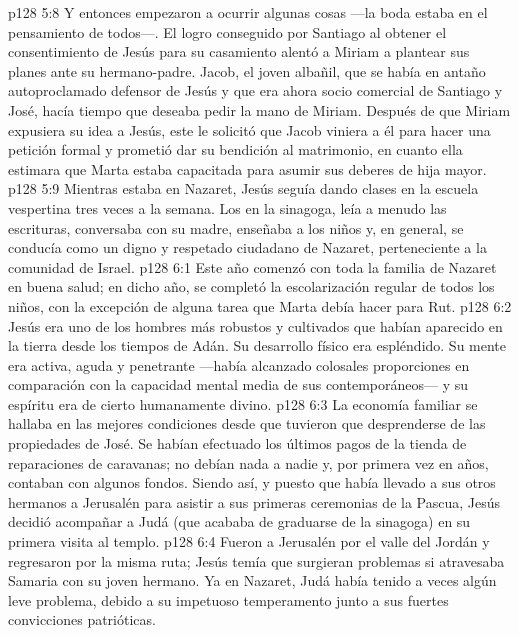 \vs p128 5:8 Y entonces empezaron a ocurrir algunas cosas ---la boda estaba en el pensamiento de todos---. El logro conseguido por Santiago al obtener el consentimiento de Jesús para su casamiento alentó a Miriam a plantear sus planes ante su hermano\hyp{}padre. Jacob, el joven albañil, que se había en antaño autoproclamado defensor de Jesús y que era ahora socio comercial de Santiago y José, hacía tiempo que deseaba pedir la mano de Miriam. Después de que Miriam expusiera su idea a Jesús, este le solicitó que Jacob viniera a él para hacer una petición formal y prometió dar su bendición al matrimonio, en cuanto ella estimara que Marta estaba capacitada para asumir sus deberes de hija mayor.
\vs p128 5:9 \pc Mientras estaba en Nazaret, Jesús seguía dando clases en la escuela vespertina tres veces a la semana. Los  en la sinagoga, leía a menudo las escrituras, conversaba con su madre, enseñaba a los niños y, en general, se conducía como un digno y respetado ciudadano de Nazaret, perteneciente a la comunidad de Israel.
\vs p128 6:1 Este año comenzó con toda la familia de Nazaret en buena salud; en dicho año, se completó la escolarización regular de todos los niños, con la excepción de alguna tarea que Marta debía hacer para Rut.
\vs p128 6:2 \pc Jesús era uno de los hombres más robustos y cultivados que habían aparecido en la tierra desde los tiempos de Adán. Su desarrollo físico era espléndido. Su mente era activa, aguda y penetrante ---había alcanzado colosales proporciones en comparación con la capacidad mental media de sus contemporáneos--- y su espíritu era de cierto humanamente divino.
\vs p128 6:3 \pc La economía familiar se hallaba en las mejores condiciones desde que tuvieron que desprenderse de las propiedades de José. Se habían efectuado los últimos pagos de la tienda de reparaciones de caravanas; no debían nada a nadie y, por primera vez en años, contaban con algunos fondos. Siendo así, y puesto que había llevado a sus otros hermanos a Jerusalén para asistir a sus primeras ceremonias de la Pascua, Jesús decidió acompañar a Judá (que acababa de graduarse de la sinagoga) en su primera visita al templo.
\vs p128 6:4 Fueron a Jerusalén por el valle del Jordán y regresaron por la misma ruta; Jesús temía que surgieran problemas si atravesaba Samaria con su joven hermano. Ya en Nazaret, Judá había tenido a veces algún leve problema, debido a su impetuoso temperamento junto a sus fuertes convicciones patrióticas.
